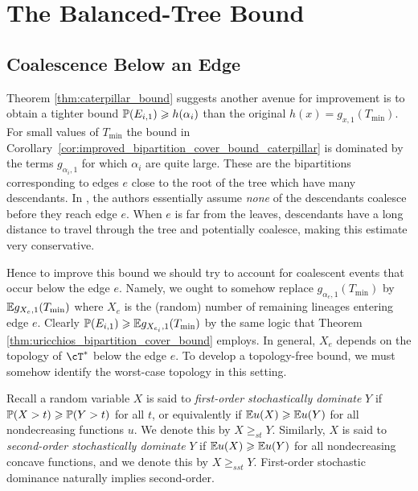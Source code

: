 \section{The Balanced-Tree Bound}
\label{sec:balanced-tree-bound}

\subsection{Coalescence Below an Edge}
\label{sec:coalescent-events-below-edge}

Theorem \ref{thm:caterpillar_bound} suggests another avenue for improvement is to
obtain a tighter bound $\P(E_{i,1}) \geq h(\alpha_i)$ than the original $h(x) = g_{x,1}(T_{\mathrm{min}})$.
For small values of $T_{\mathrm{min}}$ the bound in Corollary~\ref{cor:improved_bipartition_cover_bound_caterpillar}
is dominated by the terms $g_{\alpha_i,1}$ for which $\alpha_i$ are quite large. These are the bipartitions
 corresponding to edges $e$ close to the root of the tree which have many descendants. In \citet{uricchio2016_bipartition_cover},
 the authors essentially assume \textit{none} of the descendants coalesce before they reach edge $e$.
 When $e$ is far from the leaves, descendants have a long distance to travel through
 the tree and potentially coalesce, making this estimate very conservative.

Hence to improve this bound we should try to account for coalescent events that occur
below the edge $e$. Namely, we ought to somehow replace $g_{\alpha_e,1}(T_{\mathrm{min}})$
by $\E g_{X_e, 1}(T_{\mathrm{min}})$ where $X_e$ is the (random) number of remaining lineages
entering edge $e$. Clearly $\P(E_{i,1}) \geq \E g_{X_{e_i}, 1}(T_{\mathrm{min}})$ by the same
logic that Theorem \ref{thm:uricchios_bipartition_cover_bound} employs. In general, $X_e$ depends on
the topology of $\cT^*$ below the edge $e$. To develop a topology-free bound,
we must somehow identify the worst-case topology in this setting.

Recall a random variable $X$ is said to \textit{first-order stochastically dominate} $Y$
if $\P(X > t) \geq \P(Y > t)$ for all $t$, or equivalently if $\E u(X) \geq \E u(Y)$ for all nondecreasing
functions $u$. We denote this by $X \geq_{st} Y$. Similarly, $X$ is said to \textit{second-order stochastically dominate}
$Y$ if $\E u(X) \geq \E u(Y)$ for all nondecreasing concave functions, and we denote this
by $X \geq_{sst} Y$. First-order stochastic dominance naturally implies second-order.

